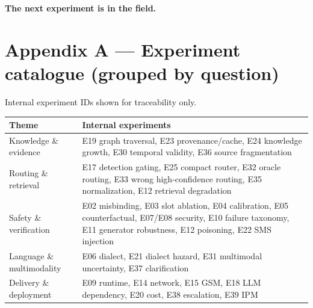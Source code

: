 \documentclass[11pt,a4paper]{article}
\begin{document}
\vspace{6mm}
\begin{center}{\Large\bfseries\color{kcearth}The next experiment is in the field.}\end{center}

\newpage
\section*{\color{kcgreen}Appendix A --- Experiment catalogue (grouped by question)}
{\footnotesize Internal experiment IDs shown for traceability only.}

\begin{tabularx}{\linewidth}{lX}
\toprule
\textbf{Theme} & \textbf{Internal experiments}\\
\midrule
Knowledge \& evidence & E19 graph traversal, E23 provenance/cache, E24 knowledge growth, E30 temporal validity, E36 source fragmentation\\
Routing \& retrieval & E17 detection gating, E25 compact router, E32 oracle routing, E33 wrong high-confidence routing, E35 normalization, E12 retrieval degradation\\
Safety \& verification & E02 misbinding, E03 slot ablation, E04 calibration, E05 counterfactual, E07/E08 security, E10 failure taxonomy, E11 generator robustness, E12 poisoning, E22 SMS injection\\
Language \& multimodality & E06 dialect, E21 dialect hazard, E31 multimodal uncertainty, E37 clarification\\
Delivery \& deployment & E09 runtime, E14 network, E15 GSM, E18 LLM dependency, E20 cost, E38 escalation, E39 IPM\\
\bottomrule
\end{tabularx}
\end{document}
